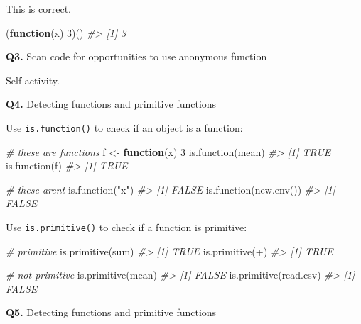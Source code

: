 \documentclass[
]{book}
\newenvironment{Shaded}{\begin{snugshade}}{\end{snugshade}}
\newcommand{\AttributeTok}[1]{\textcolor[rgb]{0.77,0.63,0.00}{#1}}
\newcommand{\CommentTok}[1]{\textcolor[rgb]{0.56,0.35,0.01}{\textit{#1}}}
\newcommand{\ControlFlowTok}[1]{\textcolor[rgb]{0.13,0.29,0.53}{\textbf{#1}}}
\newcommand{\DecValTok}[1]{\textcolor[rgb]{0.00,0.00,0.81}{#1}}
\newcommand{\FunctionTok}[1]{\textcolor[rgb]{0.00,0.00,0.00}{#1}}
\newcommand{\NormalTok}[1]{#1}
\newcommand{\OtherTok}[1]{\textcolor[rgb]{0.56,0.35,0.01}{#1}}
\newcommand{\StringTok}[1]{\textcolor[rgb]{0.31,0.60,0.02}{#1}}
\begin{document}
This is correct.

\begin{Shaded}
\begin{Highlighting}[]
\NormalTok{(}\ControlFlowTok{function}\NormalTok{(x) }\DecValTok{3}\NormalTok{)()}
\CommentTok{\#\textgreater{} [1] 3}
\end{Highlighting}
\end{Shaded}

\textbf{Q3.} Scan code for opportunities to use anonymous function

Self activity.

\textbf{Q4.} Detecting functions and primitive functions

Use \texttt{is.function()} to check if an object is a function:

\begin{Shaded}
\begin{Highlighting}[]
\CommentTok{\# these are functions}
\NormalTok{f }\OtherTok{\textless{}{-}} \ControlFlowTok{function}\NormalTok{(x) }\DecValTok{3}
\FunctionTok{is.function}\NormalTok{(mean)}
\CommentTok{\#\textgreater{} [1] TRUE}
\FunctionTok{is.function}\NormalTok{(f)}
\CommentTok{\#\textgreater{} [1] TRUE}

\CommentTok{\# these aren\textquotesingle{}t}
\FunctionTok{is.function}\NormalTok{(}\StringTok{"x"}\NormalTok{)}
\CommentTok{\#\textgreater{} [1] FALSE}
\FunctionTok{is.function}\NormalTok{(}\FunctionTok{new.env}\NormalTok{())}
\CommentTok{\#\textgreater{} [1] FALSE}
\end{Highlighting}
\end{Shaded}

Use \texttt{is.primitive()} to check if a function is primitive:

\begin{Shaded}
\begin{Highlighting}[]
\CommentTok{\# primitive}
\FunctionTok{is.primitive}\NormalTok{(sum)}
\CommentTok{\#\textgreater{} [1] TRUE}
\FunctionTok{is.primitive}\NormalTok{(}\StringTok{\textasciigrave{}}\AttributeTok{+}\StringTok{\textasciigrave{}}\NormalTok{)}
\CommentTok{\#\textgreater{} [1] TRUE}

\CommentTok{\# not primitive}
\FunctionTok{is.primitive}\NormalTok{(mean)}
\CommentTok{\#\textgreater{} [1] FALSE}
\FunctionTok{is.primitive}\NormalTok{(read.csv)}
\CommentTok{\#\textgreater{} [1] FALSE}
\end{Highlighting}
\end{Shaded}

\textbf{Q5.} Detecting functions and primitive functions
\end{document}
